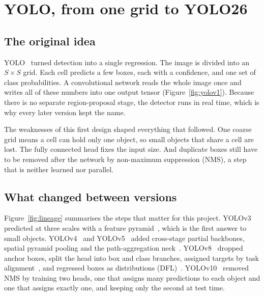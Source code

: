 \chapter{YOLO, from one grid to YOLO26}

\section{The original idea}

YOLO~\cite{redmon2016yolo} turned detection into a single regression. The image is divided into an $S\times S$ grid.
Each cell predicts a few boxes, each with a confidence, and one set of class probabilities. A convolutional network
reads the whole image once and writes all of these numbers into one output tensor (Figure~\ref{fig:yolov1}).
Because there is no separate region-proposal stage, the detector runs in real time, which is why every later
version kept the name.


The weaknesses of this first design shaped everything that followed. One coarse grid means a cell can hold only
one object, so small objects that share a cell are lost. The fully connected head fixes the input size. And
duplicate boxes still have to be removed after the network by non-maximum suppression (NMS), a step that is
neither learned nor parallel.

\section{What changed between versions}

Figure~\ref{fig:lineage} summarises the steps that matter for this project. YOLOv3~\cite{redmon2018yolov3}
predicted at three scales with a feature pyramid~\cite{lin2017fpn}, which is the first answer to small objects.
YOLOv4~\cite{bochkovskiy2020yolov4} and YOLOv5~\cite{jocher2020yolov5} added cross-stage partial backbones,
spatial pyramid pooling and the path-aggregation neck~\cite{liu2018panet}. YOLOv8~\cite{jocher2023yolov8} dropped
anchor boxes, split the head into box and class branches, assigned targets by task alignment~\cite{feng2021tood},
and regressed boxes as distributions (DFL)~\cite{li2020gfl}. YOLOv10~\cite{wang2024yolov10} removed NMS by training
two heads, one that assigns many predictions to each object and one that assigns exactly one, and keeping only the
second at test time.

